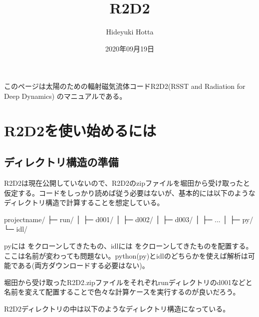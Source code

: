\documentclass[letterpaper,10pt,dvipdfmx,report]{sphinxmanual}
\title{R2D2}
\date{2020年09月19日}
\author{Hideyuki Hotta}
\let\sphinxpxdimen\pdfpxdimen\else\newdimen\sphinxpxdimen
\begin{document}
\pagestyle{empty}
\sphinxmaketitle
\pagestyle{plain}
\sphinxtableofcontents
\pagestyle{normal}
\label{\detokenize{index::doc}}


このページは太陽のための輻射磁気流体コードR2D2(RSST and Radiation for Deep Dynamics)
のマニュアルである。


\noindent\sphinxincludegraphics[width=350\sphinxpxdimen]{{R2D2_logo_red}.png}


\chapter{R2D2を使い始めるには}
\label{\detokenize{start:r2d2}}\label{\detokenize{start::doc}}

\section{ディレクトリ構造の準備}
\label{\detokenize{start:id1}}
R2D2は現在公開していないので、R2D2のzipファイルを堀田から受け取ったと仮定する。コードをしっかり読めば従う必要はないが、基本的には以下のようなディレクトリ構造で計算することを想定している。

\begin{sphinxVerbatim}[commandchars=\\\{\}]
project\PYGZus{}name/
           ├─ run/
           │    ├─ d001/
           │    ├─ d002/
           │    ├─ d003/
           │    ├─ ...
           │
           ├─ py/
           └─ idl/
\end{sphinxVerbatim}

pyには  をクローンしてきたもの、idlには  をクローンしてきたものを配置する。ここは名前が変わっても問題ない。python(py)とidlのどちらかを使えば解析は可能である(両方ダウンロードする必要はない)。

堀田から受け取ったR2D2.zipファイルをそれぞれrunディレクトリのd001などと名前を変えて配置することで色々な計算ケースを実行するのが良いだろう。

R2D2ディレクトリの中は以下のようなディレクトリ構造になっている。
\end{document}
